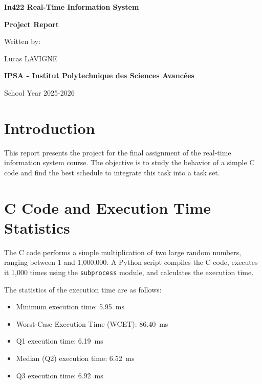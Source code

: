 \documentclass{report}
\author{Jérémy Table}
\date{3 juin 2024}
\begin{document}
\begin{titlepage}
    \centering
    \vspace*{10mm}
    
    \Huge
    \textbf{In422 Real-Time Information System}

    \huge
    \textbf{Project Report}
    
    \vspace{10mm}
    
    \large
    Written by:
    \vspace{4mm}
    
    \large
    Lucas LAVIGNE
    
    \vspace{18mm}
    
    \large
    \textbf{IPSA - Institut Polytechnique des Sciences Avancées}
    
    \vspace{3mm}
    \large
    School Year 2025-2026
    
\end{titlepage}

\tableofcontents
\newpage

\section{Introduction}
This report presents the project for the final assignment of the real-time information system course.
The objective is to study the behavior of a simple C code and find the best schedule to integrate this task into a task set.

\section{C Code and Execution Time Statistics}

The C code performs a simple multiplication of two large random numbers, ranging between 1 and 1,000,000.
A Python script compiles the C code, executes it 1,000 times using the \texttt{subprocess} module, and calculates the execution time.

The statistics of the execution time are as follows:
\begin{itemize}
\item Minimum execution time: 5.95~ms
\item Worst-Case Execution Time (WCET): 86.40~ms
\item Q1 execution time: 6.19~ms
\item Median (Q2) execution time: 6.52~ms
\item Q3 execution time: 6.92~ms
\end{itemize}
\end{document}
